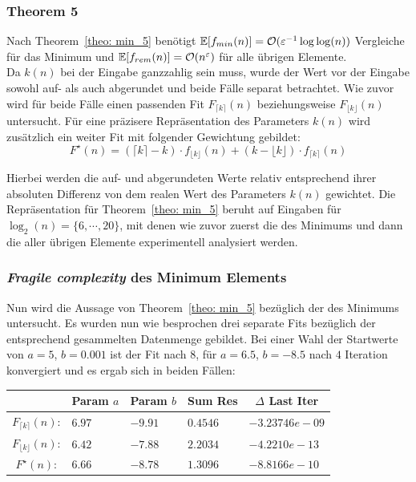 \subsubsection{Theorem 5}		%

\noindent
Nach Theorem~\ref{theo: min_5} benötigt \Rm $\mathbb{E}[f_{min}(n)]=\mathcal{O}(\varepsilon^{-1}\log\log(n))$ Vergleiche für das Minimum und $\mathbb{E}[f_{rem}(n)]=\mathcal{O}(n^{\varepsilon})$ für alle übrigen Elemente.\\[.1cm]
Da $k(n)$ bei der Eingabe ganzzahlig sein muss, wurde der Wert vor der Eingabe sowohl auf- als auch abgerundet und beide Fälle separat betrachtet. Wie zuvor wird für beide Fälle einen passenden Fit $F_{\lceil k \rceil}(n)$ beziehungsweise $F_{\lfloor k \rfloor}(n)$ untersucht. Für eine präzisere Repräsentation des Parameters $k(n)$ wird zusätzlich ein weiter Fit mit folgender Gewichtung gebildet:
\[F^{\star}(n) = (\lceil k \rceil - k) \cdot f_{\lfloor k\rfloor}(n) + (k - \lfloor k \rfloor)\cdot f_{\lceil k \rceil}(n)
\]\label{other: weigh}

\noindent
Hierbei werden die auf- und abgerundeten Werte relativ entsprechend ihrer absoluten Differenz von dem realen Wert des Parameters $k(n)$ gewichtet. Die Repräsentation für Theorem~\ref{theo: min_5} beruht auf Eingaben für $\log_2(n)=\{6,\cdots,20\}$, mit denen wie zuvor zuerst die \fg des Minimums \fgm und dann die aller übrigen Elemente \fgr experimentell analysiert werden.

\subsubsection*{\textit{Fragile complexity} des Minimum Elements}
Nun wird die Aussage von Theorem~\ref{theo: min_5} bezüglich der \fg des Minimums \fgm untersucht. Es wurden nun wie besprochen drei separate Fits bezüglich der entsprechend gesammelten Datenmenge gebildet. Bei einer Wahl der Startwerte von $a=5$, $b=0.001$ ist der Fit nach $8$, für $a=6.5$, $b=-8.5$ nach $4$ Iteration konvergiert und es ergab sich in beiden Fällen:
\begin{center}
\begin{tabular}{c||l|l|l|l}

&\multicolumn{1}{c|}{Param $a$}&
\multicolumn{1}{c|}{Param $b$}&
\multicolumn{1}{c|}{Sum Res}&
\multicolumn{1}{c}{$\Delta$ Last Iter}\\
\hline
$F_{\lceil k \rceil}(n)$:&$6.97$&$-9.91$&$0.4546$&$-3.23746e-09$\\
\hline
$F_{\lfloor k \rfloor}(n)$:&$6.42$&$-7.88$&$2.2034$&$-4.2210e-13$\\
\hline
$F^{\star}(n)$:&$6.66$&$-8.78$&$1.3096$&$-8.8166e-10$
\end{tabular}
\end{center}

